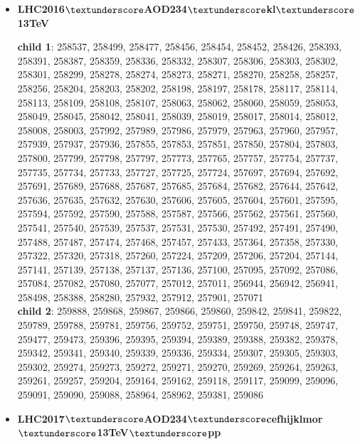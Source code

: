 \begin{itemize}
	
	\item \textbf{LHC2016$\textunderscore$AOD234$\textunderscore$kl$\textunderscore$13TeV} 

	\textbf{child 1}: 258537, 258499, 258477, 258456, 258454, 258452, 258426, 258393, 258391, 258387, 258359, 258336, 258332, 258307, 258306, 258303, 258302, 258301, 258299, 258278, 258274, 258273, 258271, 258270, 258258, 258257, 258256, 258204, 258203, 258202, 258198, 258197, 258178, 258117, 258114, 258113, 258109, 258108, 258107, 258063, 258062, 258060, 258059, 258053, 258049, 258045, 258042, 258041, 258039, 258019, 258017, 258014, 258012, 258008, 258003, 257992, 257989, 257986, 257979, 257963, 257960, 257957, 257939, 257937, 257936, 257855, 257853, 257851, 257850, 257804, 257803, 257800, 257799, 257798, 257797, 257773, 257765, 257757, 257754, 257737, 257735, 257734, 257733, 257727, 257725, 257724, 257697, 257694, 257692, 257691, 257689, 257688, 257687, 257685, 257684, 257682, 257644, 257642, 257636, 257635, 257632, 257630, 257606, 257605, 257604, 257601, 257595, 257594, 257592, 257590, 257588, 257587, 257566, 257562, 257561, 257560, 257541, 257540, 257539, 257537, 257531, 257530, 257492, 257491, 257490, 257488, 257487, 257474, 257468, 257457, 257433, 257364, 257358, 257330, 257322, 257320, 257318, 257260, 257224, 257209, 257206, 257204, 257144, 257141, 257139, 257138, 257137, 257136, 257100, 257095, 257092, 257086, 257084, 257082, 257080, 257077, 257012, 257011, 256944, 256942, 256941, 258498, 258388, 258280, 257932, 257912, 257901, 257071 \\
	\textbf{child 2}: 259888, 259868, 259867, 259866, 259860, 259842, 259841, 259822, 259789, 259788, 259781, 259756, 259752, 259751, 259750, 259748, 259747, 259477, 259473, 259396, 259395, 259394, 259389, 259388, 259382, 259378, 259342, 259341, 259340, 259339, 259336, 259334, 259307, 259305, 259303, 259302, 259274, 259273, 259272, 259271, 259270, 259269, 259264, 259263, 259261, 259257, 259204, 259164, 259162, 259118, 259117, 259099, 259096, 259091, 259090, 259088, 258964, 258962,  259381, 259086	

	\item \textbf{LHC2017$\textunderscore$AOD234$\textunderscore$cefhijklmor$\textunderscore$13TeV$\textunderscore$pp} 


\end{itemize}

